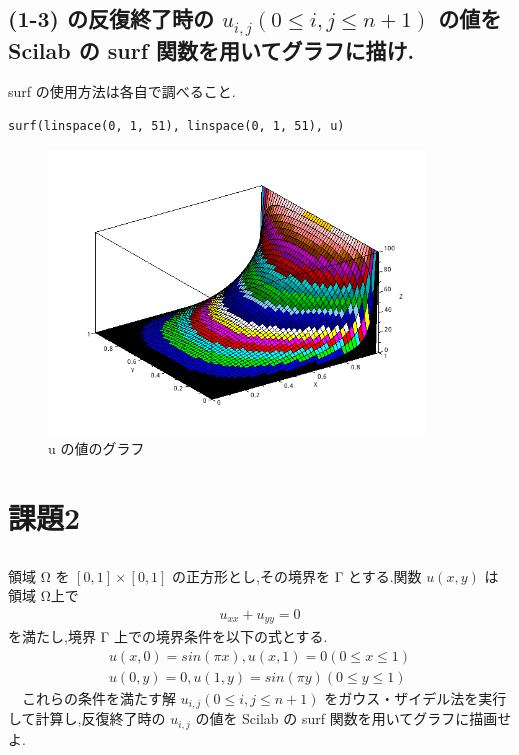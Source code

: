 \documentclass{scrartcl}
\begin{document}
\subsection{(1-3) の反復終了時の \(u_{i,j} (0 \leq i, j \leq n + 1)\) の値を Scilab の surf 関数を用いてグラフに描け.}
\label{sec:org030b0e4}
surf の使用方法は各自で調べること.\\
\begin{verbatim}
surf(linspace(0, 1, 51), linspace(0, 1, 51), u)
\end{verbatim}
\begin{figure}[htbp]
\centering
\includegraphics[width=10cm]{./1-4.png}
\caption{u の値のグラフ}
\end{figure}
\section{課題2}
\label{sec:orgaa5717a}
\subsection{}
\label{sec:orgde6ac2d}
領域 Ω を \([0, 1] \times [0, 1]\) の正方形とし,その境界を Γ とする.関数 \(u(x, y)\) は領域 Ω上で\\
\begin{eqnarray*}
u_{xx} + u_{yy} = 0
\end{eqnarray*}
を満たし,境界 Γ 上での境界条件を以下の式とする.\\
\begin{eqnarray*}
u(x, 0) = sin(\pi x), u(x, 1) = 0 (0 \leq x \leq 1) \\
u(0, y) = 0, u(1, y) = sin(\pi y) (0 \leq y \leq 1)
\end{eqnarray*}
　これらの条件を満たす解 \(u_{i,j} (0 \leq i, j \leq n + 1)\) をガウス・ザイデル法を実行して計算し,反復終了時の \(u_{i,j}\) の値を Scilab の surf 関数を用いてグラフに描画せよ.\\
\end{document}
